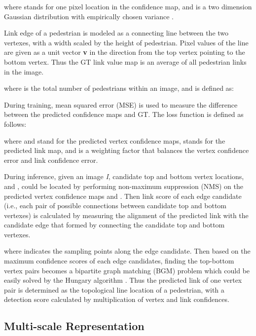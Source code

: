 \documentclass[runningheads]{llncs}
\begin{document}
where  stands for one pixel location in the confidence map, and  is a two dimension Gaussian distribution with empirically chosen variance .

Link edge of a pedestrian  is modeled as a connecting line between the two vertexes, with a width scaled by the height of pedestrian. Pixel values of the line are given as a unit vector {\bf v} in the direction from the top vertex pointing to the bottom vertex. Thus the GT link value map  is an average of all  pedestrian links in the image.

where  is the total number of pedestrians within an image, and  is defined as:


During training,  mean squared error (MSE) is used to measure the difference between the predicted conﬁdence maps and GT. The loss function  is deﬁned as follows:

where   and  stand for the predicted vertex conﬁdence maps,  stands for the predicted link map, and  is a weighting factor that balances the vertex confidence error and link confidence error. 

During inference, given an image {\it I}, candidate top and bottom vertex locations,  and , could be located by performing non-maximum suppression (NMS) on the predicted vertex conﬁdence maps  and . Then link score of each edge candidate (i.e., each pair of possible connections between candidate top and bottom vertexes) is calculated by measuring the alignment of the predicted link  with the candidate edge that formed by connecting the candidate top and bottom vertexes.

where  indicates the sampling points along the edge candidate. Then based on the maximum confidence scores of each edge candidates, finding the top-bottom vertex pairs becomes a bipartite graph matching (BGM) \cite{BGM} problem which could be easily solved by the Hungary algorithm \cite{Hungarian}. Thus the predicted link of one vertex pair is determined as the topological line location of a pedestrian, with a detection score calculated by multiplication of vertex and link confidences.

\subsection{Multi-scale Representation}\label{sec:multi-rep}
\end{document}
